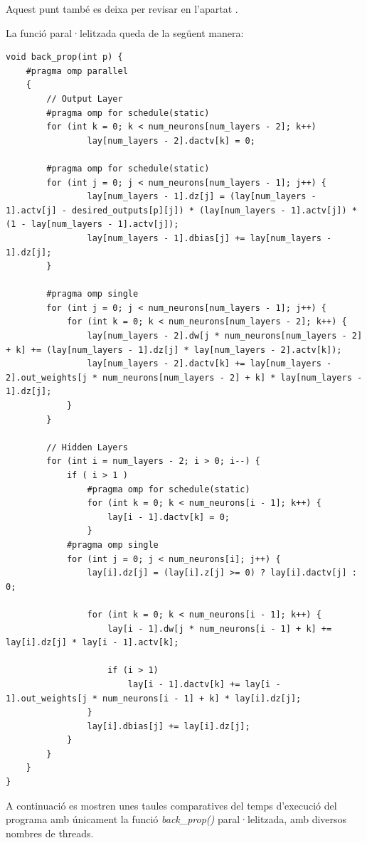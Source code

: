 \documentclass{article}
\begin{document}
Aquest punt també es deixa per revisar en l'apartat \texttt{}.


La funció paral·lelitzada queda de la següent manera:
\begin{lstlisting}
void back_prop(int p) {
    #pragma omp parallel
    {
        // Output Layer
        #pragma omp for schedule(static)
        for (int k = 0; k < num_neurons[num_layers - 2]; k++)
                lay[num_layers - 2].dactv[k] = 0;

        #pragma omp for schedule(static)
        for (int j = 0; j < num_neurons[num_layers - 1]; j++) {
                lay[num_layers - 1].dz[j] = (lay[num_layers - 1].actv[j] - desired_outputs[p][j]) * (lay[num_layers - 1].actv[j]) * (1 - lay[num_layers - 1].actv[j]);
                lay[num_layers - 1].dbias[j] += lay[num_layers - 1].dz[j];
        }

        #pragma omp single
        for (int j = 0; j < num_neurons[num_layers - 1]; j++) {
            for (int k = 0; k < num_neurons[num_layers - 2]; k++) {
                lay[num_layers - 2].dw[j * num_neurons[num_layers - 2] + k] += (lay[num_layers - 1].dz[j] * lay[num_layers - 2].actv[k]);
                lay[num_layers - 2].dactv[k] += lay[num_layers - 2].out_weights[j * num_neurons[num_layers - 2] + k] * lay[num_layers - 1].dz[j];
            }
        }

        // Hidden Layers
        for (int i = num_layers - 2; i > 0; i--) {
            if ( i > 1 )
                #pragma omp for schedule(static)
                for (int k = 0; k < num_neurons[i - 1]; k++) {
                    lay[i - 1].dactv[k] = 0;
                }
            #pragma omp single
            for (int j = 0; j < num_neurons[i]; j++) {
                lay[i].dz[j] = (lay[i].z[j] >= 0) ? lay[i].dactv[j] : 0;

                for (int k = 0; k < num_neurons[i - 1]; k++) {
                    lay[i - 1].dw[j * num_neurons[i - 1] + k] += lay[i].dz[j] * lay[i - 1].actv[k];

                    if (i > 1)
                        lay[i - 1].dactv[k] += lay[i - 1].out_weights[j * num_neurons[i - 1] + k] * lay[i].dz[j];
                }
                lay[i].dbias[j] += lay[i].dz[j];
            }
        }
    }
}
\end{lstlisting}

A continuació es mostren unes taules comparatives del temps d'execució del programa amb únicament la funció \textit{back\_prop()} paral·lelitzada, amb diversos nombres de threads.
\end{document}
